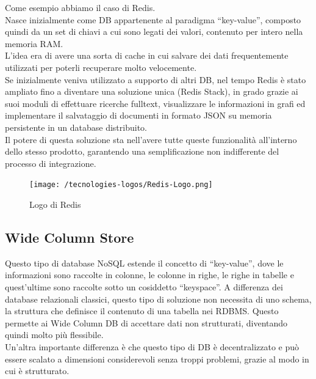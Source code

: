 \noindent Come esempio abbiamo il caso di Redis.\\
Nasce inizialmente come DB appartenente al paradigma ``key-value'', composto quindi da un set di chiavi a cui sono legati dei valori, contenuto per intero nella memoria RAM.\\
L'idea era di avere una sorta di cache in cui salvare dei dati frequentemente utilizzati per poterli recuperare molto velocemente.\\
Se inizialmente veniva utilizzato a supporto di altri DB, nel tempo Redis è stato ampliato fino a diventare una soluzione unica (Redis Stack), in grado grazie ai suoi moduli di effettuare ricerche fulltext, visualizzare le informazioni in grafi ed implementare il salvataggio di documenti in formato JSON su memoria persistente in un database distribuito.\\
Il potere di questa soluzione sta nell'avere tutte queste funzionalità all'interno dello stesso prodotto, garantendo una semplificazione non indifferente del processo di integrazione.

\begin{figure}[htbp]
\begin{center}
\texttt{[image: /tecnologies-logos/Redis-Logo.png]}
\caption{Logo di Redis}
\end{center}
\end{figure}

\subsection{Wide Column Store}
Questo tipo di database NoSQL estende il concetto di ``key-value'', dove le informazioni sono raccolte in colonne, le colonne in righe, le righe in tabelle e quest'ultime sono raccolte sotto un cosiddetto ``keyspace''. A differenza dei database relazionali classici, questo tipo di soluzione non necessita di uno schema, la struttura che definisce il contenuto di una tabella nei RDBMS. Questo permette ai Wide Column DB di accettare dati non strutturati, diventando quindi molto più flessibile.\\
Un'altra importante differenza è che questo tipo di DB è decentralizzato e può essere scalato a dimensioni considerevoli senza troppi problemi, grazie al modo in cui è strutturato.\\

